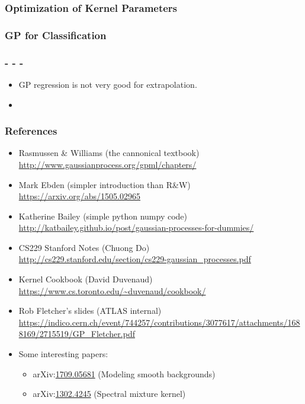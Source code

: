 \begin{frame} \frametitle{Optimization of Kernel Parameters}
\end{frame}

\begin{frame} \frametitle{GP for Classification}
\end{frame}

\begin{frame} \frametitle{- - -}
\begin{itemize}
  \item GP regression is not very good for extrapolation.
  \item {}
\end{itemize}
\end{frame}

\newcommand{\R}[2]{\item #1 \\ {\scriptsize\url{#2}}}
\newcommand{\arxiv}[1]{arXiv:\href{https://arxiv.org/abs/#1}{#1}}

\begin{frame} \frametitle{References}
\begin{itemize}
  \R{Rasmussen \& Williams (the cannonical textbook)}
    {http://www.gaussianprocess.org/gpml/chapters/}
  \R{Mark Ebden {\small(simpler introduction than R\&W)}}
    {https://arxiv.org/abs/1505.02965}
  \R{Katherine Bailey {\small(simple python\,\plus\,numpy code)}}
    {http://katbailey.github.io/post/gaussian-processes-for-dummies/}
  \R{CS229 Stanford Notes (Chuong Do)}
    {http://cs229.stanford.edu/section/cs229-gaussian_processes.pdf}
  \R{Kernel Cookbook (David Duvenaud)}
    {https://www.cs.toronto.edu/~duvenaud/cookbook/}
  \R{Rob Fletcher's slides (ATLAS internal)}
    {https://indico.cern.ch/event/744257/contributions/3077617/attachments/1688169/2715519/GP_Fletcher.pdf}
  \item Some interesting papers:
  \begin{itemize}
    \item \arxiv{1709.05681} (Modeling smooth backgrounds)
    \item \arxiv{1302.4245} (Spectral mixture kernel)
  \end{itemize}
\end{itemize}
\end{frame}

